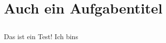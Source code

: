 %
%
%
%
\chapter{Auch ein Aufgabentitel}\label{ex:einsinnvolleslabel2}
%
%
\section{}\label{sec:einsinnvolleslabel2}
%
Das ist ein Test!
Ich bins
%
%
%
\section{}\label{sec:einsinnvolleslabel3}
%

%
\clearpage

